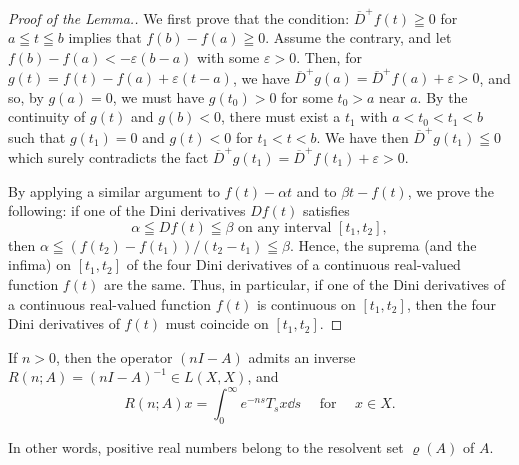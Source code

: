 \begin{proof}[Proof of the Lemma.]
We first prove that the condition: $\overline{D}^{+}f(t) \geqq 0$ for $a \leqq t \leqq b$ implies that $f(b) - f(a) \geqq 0$. Assume the contrary, and let $f(b) - f(a) < -\varepsilon (b - a)$ with some $\varepsilon > 0$. Then, for $g(t) = f(t) - f(a) + \varepsilon (t - a)$, we have $\overline{D}^{+}g(a) = \overline{D}^{+}f(a) + \varepsilon > 0$, and so, by $g(a) = 0$, we must have $g(t_0) > 0$ for some $t_0 > a$ near $a$. By the continuity of $g(t)$ and $g(b) < 0$, there must exist a $t_1$ with $a < t_0 < t_1 < b$ such that $g(t_1) = 0$ and $g(t) < 0$ for $t_1 < t < b$. We have then $\overline{D}^{+}g(t_1) \leqq 0$ which surely contradicts the fact $\overline{D}^{+}g(t_1) = \overline{D}^{+}f(t_1) + \varepsilon > 0$.

By applying a similar argument to $f(t) - \alpha t$ and to $\beta t - f(t)$, we prove the following: if one of the Dini derivatives $Df(t)$ satisfies 
\[
\alpha \leqq D f (t) \leqq \beta \text{ on any interval } [ t _{1}, t _{2} ],
\]
then $\alpha \leqq (f(t_2) - f(t_1)) / (t_2 - t_1) \leqq \beta$. Hence, the suprema (and the infima) on $[t_1, t_2]$ of the four Dini derivatives of a continuous real-valued function $f(t)$ are the same. Thus, in particular, if one of the Dini derivatives of a continuous real-valued function $f(t)$ is continuous on $[t_1, t_2]$, then the four Dini derivatives of $f(t)$ must coincide on $[t_1, t_2]$. 
\end{proof}


\label{sec:IX.4}

\begin{theorem}\label{thm:IX.4.Theorem.1} If $n > 0$, then the operator $(nI - A)$ admits an inverse $R(n;A) = (nI - A)^{-1} \in L(X,X)$, and 
\begin{equation}\label{eq:IX.4.1}
R (n; A) x = \int_{0} ^{\infty} e ^{-ns} T _{s} x \dd s \quad \text{ for } \quad x \in X.
\end{equation}
\end{theorem}

In other words, positive real numbers belong to the resolvent set $\varrho(A)$ of $A$. 

